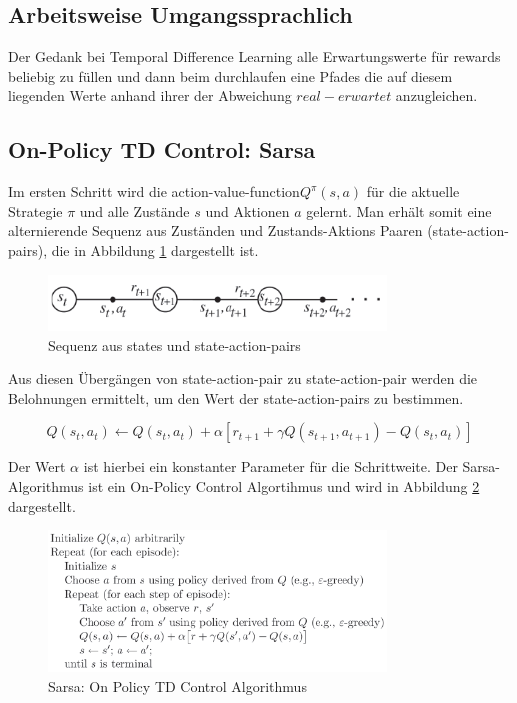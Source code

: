 \documentclass[10pt]{scrartcl}
\begin{document}
	\subsection{Arbeitsweise Umgangssprachlich}
	Der Gedank bei Temporal Difference Learning alle Erwartungswerte für rewards beliebig zu füllen und dann beim durchlaufen eine Pfades die auf diesem liegenden Werte anhand ihrer der Abweichung $real - erwartet$ anzugleichen.

\subsection{On-Policy TD Control: Sarsa}

Im ersten Schritt wird die \glqq action-value-function\grqq\xspace $Q^{\pi}(s,a)$ für die aktuelle Strategie $\pi$ und alle Zustände $s$ und Aktionen $a$ gelernt. Man erhält somit eine alternierende Sequenz aus Zuständen und Zustands-Aktions Paaren (state-action-pairs), die in Abbildung \ref{fig:SA-Pairs} dargestellt ist.

\begin{figure}[htbp]
	\centering	\includegraphics[width=0.8\textwidth]{Bilder/OnPolicy.png}
	\caption{Sequenz aus states und state-action-pairs}
	\label{fig:SA-Pairs}
\end{figure}

Aus diesen Übergängen von state-action-pair zu state-action-pair werden die Belohnungen ermittelt, um den Wert der state-action-pairs zu bestimmen.

\begin{equation}
Q(s_{t},a_{t}) \leftarrow Q(s_{t},a_{t}) + \alpha [r_{t+1} + \gamma Q(s_{t+1},a_{t+1}) - Q(s_{t},a_{t})]
\end{equation}

Der Wert $\alpha$ ist hierbei ein konstanter Parameter für die Schrittweite. Der Sarsa-Algorithmus ist ein On-Policy Control Algortihmus und wird in Abbildung \ref{fig:Sarsa} dargestellt.

\begin{figure}[htbp]
	\centering	\includegraphics[width=0.8\textwidth]{Bilder/Sarsa.png}
	\caption{Sarsa: On Policy TD Control Algorithmus}
	\label{fig:Sarsa}
\end{figure}
\end{document}
